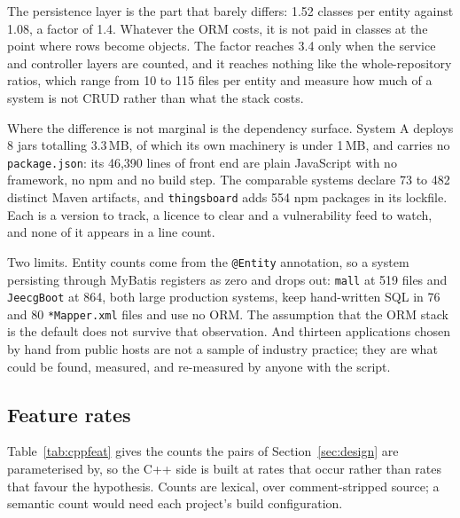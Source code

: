 \documentclass[11pt,a4paper]{article}
\begin{document}
The persistence layer is the part that barely differs: 1.52 classes per entity against 1.08, a factor of 1.4. Whatever the ORM costs, it is not paid in classes at the point where rows become objects. The factor reaches 3.4 only when the service and controller layers are counted, and it reaches nothing like the whole-repository ratios, which range from 10 to 115 files per entity and measure how much of a system is not CRUD rather than what the stack costs.

Where the difference is not marginal is the dependency surface. System A deploys 8 jars totalling 3.3\,MB, of which its own machinery is under 1\,MB, and carries no \texttt{package.json}: its 46,390 lines of front end are plain JavaScript with no framework, no npm and no build step. The comparable systems declare 73 to 482 distinct Maven artifacts, and \texttt{thingsboard} adds 554 npm packages in its lockfile. Each is a version to track, a licence to clear and a vulnerability feed to watch, and none of it appears in a line count.

Two limits. Entity counts come from the \texttt{@Entity} annotation, so a system persisting through MyBatis registers as zero and drops out: \texttt{mall} at 519 files and \texttt{JeecgBoot} at 864, both large production systems, keep hand-written SQL in 76 and 80 \texttt{*Mapper.xml} files and use no ORM. The assumption that the ORM stack is the default does not survive that observation. And thirteen applications chosen by hand from public hosts are not a sample of industry practice; they are what could be found, measured, and re-measured by anyone with the script.

\subsection{Feature rates}

Table~\ref{tab:cppfeat} gives the counts the pairs of Section~\ref{sec:design} are parameterised by, so the C++ side is built at rates that occur rather than rates that favour the hypothesis. Counts are lexical, over comment-stripped source; a semantic count would need each project's build configuration.
\end{document}
